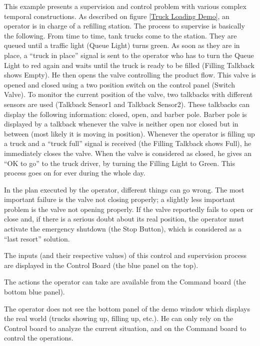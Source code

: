 
This example presents a supervision and control problem with various complex
temporal constructions. As described on figure \ref{Truck Loading Demo}, an
operator is in charge of a refilling station. The process to supervise is
basically the following.  From time to time, tank trucks come to the station.
They are queued until a traffic light (Queue Light) turns green. As soon as
they are in place, a ``truck in place'' signal is sent to the operator who has
to turn the Queue Light to red again and waits until the truck is ready to be
filled (Filling Talkback shows Empty). He then opens the valve controlling the
product flow.  This valve is opened and closed using a two position switch on
the control panel (Switch Valve). To monitor the current position of the valve,
two talkbacks with different sensors are used (Talkback Sensor1 and Talkback
Sensor2). These talkbacks can display the following information: closed, open,
and barber pole.  Barber pole is displayed by a talkback whenever the valve is
neither open nor closed but in between (most likely it is moving in position).
Whenever the operator is filling up a truck and a ``truck full'' signal is
received (the Filling Talkback shows Full), he immediately closes the valve.
When the valve is considered as closed, he gives an ``OK to go'' to the truck
driver, by turning the Filling Light to Green. This process goes on for ever
during the whole day.

In the plan executed by the operator, different things can go wrong. The most
important failure is the valve not closing properly; a slightly less important
problem is the valve not opening properly. If the valve reportedly fails to
open or close and, if there is a serious doubt about its real position, the
operator must activate the emergency shutdown (the Stop Button), which is
considered as a ``last resort'' solution.

The inputs (and their respective values) of this control and supervision
process are displayed in the Control Board (the blue panel on the top).

The actions the operator can take are available from the Command board (the
bottom blue panel).

The operator does not see the bottom panel of the demo window which displays
the real world (trucks showing up, filling up, etc.). He can only rely on the
Control board to analyze the current situation, and on the Command board to
control the operations.

